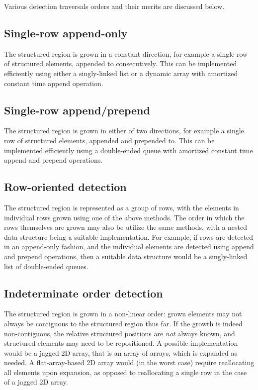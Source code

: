 Various detection traversals orders and their merits are discussed below.

\subsection{Single-row append-only}
\label{append-detection}
The structured region is grown in a constant direction, for example a single row of structured elements, appended to consecutively. This can be implemented efficiently using either a singly-linked list or a dynamic array with amortized constant time append operation.

\subsection{Single-row append/prepend}
\label{append-prepend-detection}
The structured region is grown in either of two directions, for example a single row of structured elements, appended and prepended to. This can be implemented efficiently using a double-ended queue with amortized constant time append and prepend operations.

\subsection{Row-oriented detection}
The structured region is represented as a group of rows, with the elements in individual rows grown using one of the above methods. The order in which the rows themselves are grown may also be utilize the same methods, with a nested data structure being a suitable implementation. For example, if rows are detected in an append-only fashion, and the individual elements are detected using append and prepend operations, then a suitable data structure would be a singly-linked list of double-ended queues.

\subsection{Indeterminate order detection}
The structured region is grown in a non-linear order: grown elements may not always be contiguous to the structured region thus far. If the growth is indeed non-contiguous, the relative structured positions are \emph{not} always known, and structured elements may need to be repositioned. A possible implementation would be a jagged 2D array, that is an array of arrays, which is expanded as needed. A flat-array-based 2D array would (in the worst case) require reallocating all elements upon expansion, as opposed to reallocating a single row in the case of a jagged 2D array.





